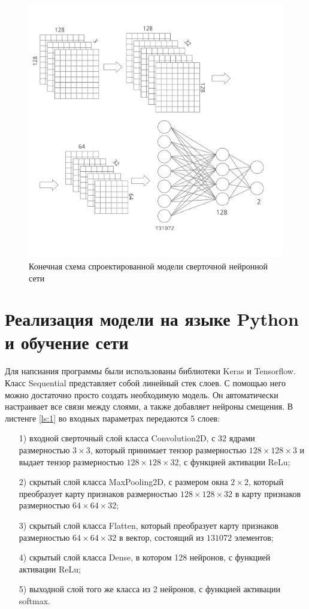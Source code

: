 \begin{figure}[!h] 
  \center
  \includegraphics [scale=0.2] {img/project.png}
  \caption{Конечная схема спроектированной модели сверточной нейронной сети} 
  \label{fig:4}  
\end{figure}
\newpage


\section{Реализация модели на языке Python и обучение сети}
Для напсиания программы были использованы библиотеки Keras и Tensorflow. Класс Sequential представляет собой линейный стек слоев. С помощью него можно достаточно просто создать необходимую модель. Он автоматически настраивает все связи между слоями, а также добавляет нейроны смещения. В листенге \ref{ls:1} во входных параметрах передаются 5 слоев:
\begin{enumerate} 
  \item[1)] входной сверточный слой класса Convolution2D, с 32 ядрами размерностью $3 \times 3$, который принимает тензор размерностью $128\times128\times3$ и выдает тензор размерностью $128\times128\times32$, с функцией активации ReLu;
  \item[2)] скрытый слой класса MaxPooling2D, с размером окна $2 \times 2$, который преобразует карту признаков размерностью $128 \times 128 \times 32$ в карту признаков размерностью $64 \times 64 \times 32$;
  \item[3)] скрытый слой класса Flatten, который преобразует карту признаков размерностью $64 \times 64 \times 32$ в вектор, состоящий из $131072$ элементов;
  \item[4)] скрытый слой класса Dense, в котором 128 нейронов, с функцией активации ReLu;
  \item[5)] выходной слой того же класса из 2 нейронов, с функцией активации softmax.
\end{enumerate}

